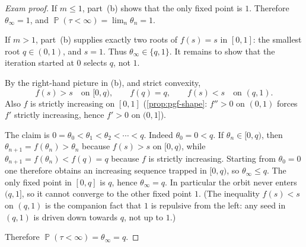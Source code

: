 \documentclass[11pt,a4paper]{article}
\DeclareMathOperator{\Pbb}{\mathbb{P}}
\begin{document}
\begin{proof}[Exam proof]
If \(m\le 1\), part~(b) shows that the only fixed point is \(1\). Therefore \(\theta_\infty=1\), and \(\Pbb(\tau<\infty)=\lim_n\theta_n=1\).

If \(m>1\), part~(b) supplies exactly two roots of \(f(s)=s\) in \([0,1]\): the smallest root \(q\in(0,1)\), and \(s=1\). Thus \(\theta_\infty\in\{q,1\}\). It remains to show that the iteration started at \(0\) selects \(q\), not \(1\).

By the right-hand picture in (b), and strict convexity,
\[
f(s)>s
\quad\text{on }[0,q),
\qquad
f(q)=q,
\qquad
f(s)<s
\quad\text{on }(q,1).
\]
Also \(f\) is strictly increasing on \([0,1]\) (\cref{prop:pgf-shape}: \(f''>0\) on \((0,1)\) forces \(f'\) strictly increasing, hence \(f'>0\) on \((0,1]\)).

The claim is \(0=\theta_0<\theta_1<\theta_2<\cdots<q\). Indeed \(\theta_0=0<q\). If \(\theta_n\in[0,q)\), then \(\theta_{n+1}=f(\theta_n)>\theta_n\) because \(f(s)>s\) on \([0,q)\), while \(\theta_{n+1}=f(\theta_n)<f(q)=q\) because \(f\) is strictly increasing. Starting from \(\theta_0=0\) one therefore obtains an increasing sequence trapped in \([0,q)\), so \(\theta_\infty\le q\). The only fixed point in \([0,q]\) is \(q\), hence \(\theta_\infty=q\). In particular the orbit never enters \((q,1]\), so it cannot converge to the other fixed point \(1\). (The inequality \(f(s)<s\) on \((q,1)\) is the companion fact that \(1\) is repulsive from the left: any seed in \((q,1)\) is driven down towards \(q\), not up to \(1\).)

\begin{center}
\end{center}

Therefore \(\Pbb(\tau<\infty)=\theta_\infty=q\).
\end{proof}
\end{document}
